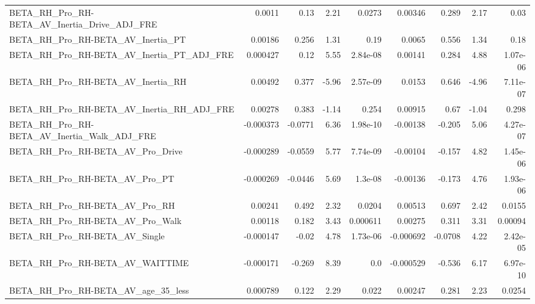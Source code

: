 \begin{tabular}{lrrrrrrrr}
BETA\_RH\_Pro\_RH-BETA\_AV\_Inertia\_Drive\_ADJ\_FRE       &      0.0011 &         0.13 &     2.21 &   0.0273 &    0.00346 &       0.289 &         2.17 &          0.03 \\
BETA\_RH\_Pro\_RH-BETA\_AV\_Inertia\_PT                  &     0.00186 &        0.256 &     1.31 &     0.19 &     0.0065 &       0.556 &         1.34 &          0.18 \\
BETA\_RH\_Pro\_RH-BETA\_AV\_Inertia\_PT\_ADJ\_FRE          &    0.000427 &         0.12 &     5.55 & 2.84e-08 &    0.00141 &       0.284 &         4.88 &      1.07e-06 \\
BETA\_RH\_Pro\_RH-BETA\_AV\_Inertia\_RH                  &     0.00492 &        0.377 &    -5.96 & 2.57e-09 &     0.0153 &       0.646 &        -4.96 &      7.11e-07 \\
BETA\_RH\_Pro\_RH-BETA\_AV\_Inertia\_RH\_ADJ\_FRE          &     0.00278 &        0.383 &    -1.14 &    0.254 &    0.00915 &        0.67 &        -1.04 &         0.298 \\
BETA\_RH\_Pro\_RH-BETA\_AV\_Inertia\_Walk\_ADJ\_FRE        &   -0.000373 &      -0.0771 &     6.36 & 1.98e-10 &   -0.00138 &      -0.205 &         5.06 &      4.27e-07 \\
BETA\_RH\_Pro\_RH-BETA\_AV\_Pro\_Drive                   &   -0.000289 &      -0.0559 &     5.77 & 7.74e-09 &   -0.00104 &      -0.157 &         4.82 &      1.45e-06 \\
BETA\_RH\_Pro\_RH-BETA\_AV\_Pro\_PT                      &   -0.000269 &      -0.0446 &     5.69 &  1.3e-08 &   -0.00136 &      -0.173 &         4.76 &      1.93e-06 \\
BETA\_RH\_Pro\_RH-BETA\_AV\_Pro\_RH                      &     0.00241 &        0.492 &     2.32 &   0.0204 &    0.00513 &       0.697 &         2.42 &        0.0155 \\
BETA\_RH\_Pro\_RH-BETA\_AV\_Pro\_Walk                    &     0.00118 &        0.182 &     3.43 & 0.000611 &    0.00275 &       0.311 &         3.31 &       0.00094 \\
BETA\_RH\_Pro\_RH-BETA\_AV\_Single                      &   -0.000147 &        -0.02 &     4.78 & 1.73e-06 &  -0.000692 &     -0.0708 &         4.22 &      2.42e-05 \\
BETA\_RH\_Pro\_RH-BETA\_AV\_WAITTIME                    &   -0.000171 &       -0.269 &     8.39 &      0.0 &  -0.000529 &      -0.536 &         6.17 &      6.97e-10 \\
BETA\_RH\_Pro\_RH-BETA\_AV\_age\_35\_less                 &    0.000789 &        0.122 &     2.29 &    0.022 &    0.00247 &       0.281 &         2.23 &        0.0254 \\

\end{tabular}

